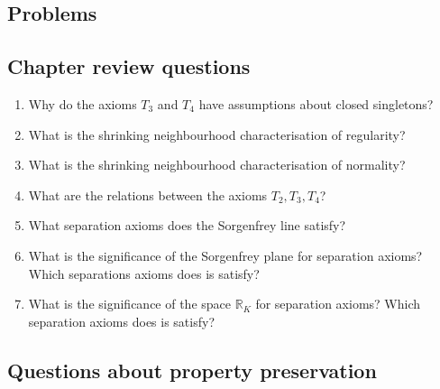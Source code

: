 \subsection{Problems}

\subsection{Chapter review questions}

\begin{enumerate}
    \item Why do the axioms \( T_3 \) and \( T_4 \) have assumptions about closed singletons?

    \item What is the shrinking neighbourhood characterisation of regularity?

    \item What is the shrinking neighbourhood characterisation of normality?

    \item What are the relations between the axioms \( T_2, T_3, T_4 \)?

    \item What separation axioms does the Sorgenfrey line satisfy?

    \item What is the significance of the Sorgenfrey plane for separation axioms? Which separations axioms does is satisfy?

    \item What is the significance of the space \( \mathbb{R}_K \) for separation axioms? Which separation axioms does is satisfy?
\end{enumerate}

\subsection{Questions about property preservation}

